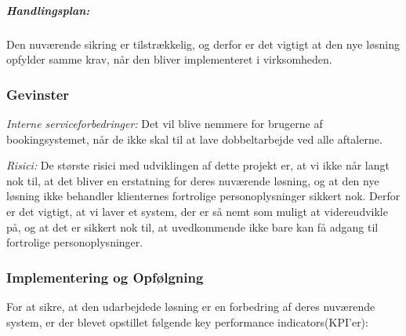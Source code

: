 \subparagraph{Handlingsplan:}
Den nuværende sikring er tilstrækkelig, og derfor er det vigtigt at den nye løsning opfylder samme krav, når den bliver implementeret i virksomheden.

\subsubsection{Gevinster}
\textit{Interne serviceforbedringer:}
Det vil blive nemmere for brugerne af bookingsystemet, når de ikke skal til at lave dobbeltarbejde ved alle aftalerne.

\textit{Risici:}
De største risici med udviklingen af dette projekt er, at vi ikke når langt nok til, at det bliver en erstatning for deres nuværende løsning, og at den nye løsning ikke behandler klienternes fortrolige personoplysninger sikkert nok.
Derfor er det vigtigt, at vi laver et system, der er så nemt som muligt at videreudvikle på, og at det er sikkert nok til, at uvedkommende ikke bare kan få adgang til fortrolige personoplysninger.

\subsubsection{Implementering og Opfølgning}

For at sikre, at den udarbejdede løsning er en forbedring af deres nuværende system, er der blevet opstillet følgende key performance indicators(KPI'er):

